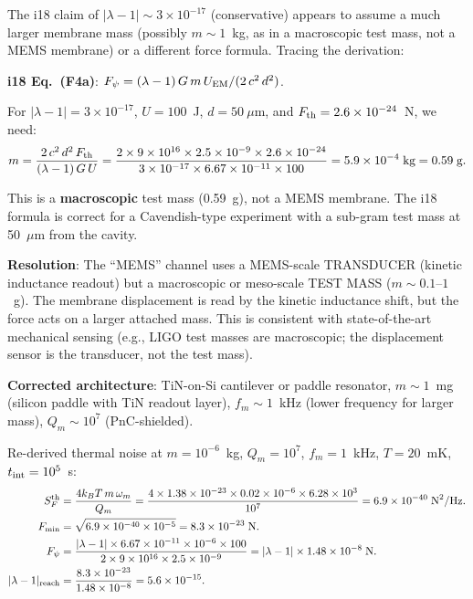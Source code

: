 \documentclass[11pt]{article}
\newcommand{\ee}[1]{\times 10^{#1}}
\newcommand{\lbone}{|\lambda - 1|}
\theoremstyle{definition}
\theoremstyle{remark}
\begin{document}
\begin{tcolorbox}[colback=red!5!white, colframe=red!60!black,
  title=\textbf{CRITICAL AUDIT: i18 MEMS DC Reach Requires Re-examination}]

The i18 claim of $\lbone \sim 3\ee{-17}$ (conservative) appears to
assume a much larger membrane mass (possibly $m \sim 1$~kg, as in
a macroscopic test mass, not a MEMS membrane) or a different
force formula. Tracing the derivation:

\textbf{i18 Eq.~(F4a)}: $F_\psi = (\lambda-1)\,G\,m\,U_{\rm EM}/
(2\,c^2\,d^2)$.

For $\lbone = 3\ee{-17}$, $U = 100$~J, $d = 50~\mu$m, and
$F_{\rm th} = 2.6\ee{-24}$~N, we need:
\[
m = \frac{2\,c^2\,d^2\,F_{\rm th}}{(\lambda-1)\,G\,U}
= \frac{2 \times 9\ee{16} \times 2.5\ee{-9} \times 2.6\ee{-24}}
{3\ee{-17} \times 6.67\ee{-11} \times 100}
= 5.9\ee{-4}\;\text{kg} = 0.59\;\text{g}.
\]

This is a \textbf{macroscopic} test mass (0.59~g), not a MEMS membrane.
The i18 formula is correct for a Cavendish-type experiment with a
sub-gram test mass at 50~$\mu$m from the cavity.

\textbf{Resolution}: The ``MEMS'' channel uses a MEMS-scale TRANSDUCER
(kinetic inductance readout) but a macroscopic or meso-scale TEST MASS
($m \sim 0.1$--$1$~g). The membrane displacement is read by the kinetic
inductance shift, but the force acts on a larger attached mass. This
is consistent with state-of-the-art mechanical sensing (e.g., LIGO
test masses are macroscopic; the displacement sensor is the transducer,
not the test mass).

\textbf{Corrected architecture}: TiN-on-Si cantilever or paddle
resonator, $m \sim 1$~mg (silicon paddle with TiN readout layer),
$f_m \sim 1$~kHz (lower frequency for larger mass), $Q_m \sim 10^7$
(PnC-shielded).

Re-derived thermal noise at $m = 10^{-6}$~kg, $Q_m = 10^7$,
$f_m = 1$~kHz, $T = 20$~mK, $t_{\rm int} = 10^5$~s:
\begin{align}
S_F^{\rm th} &= \frac{4 k_B T\,m\,\omega_m}{Q_m}
= \frac{4 \times 1.38\ee{-23} \times 0.02 \times 10^{-6}
\times 6.28\ee{3}}{10^7}
= 6.9\ee{-40}\;\text{N}^2/\text{Hz}. \\
F_{\rm min} &= \sqrt{6.9\ee{-40} \times 10^{-5}}
= 8.3\ee{-23}\;\text{N}. \\
F_\psi &= \frac{\lbone \times 6.67\ee{-11} \times 10^{-6} \times 100}
{2 \times 9\ee{16} \times 2.5\ee{-9}}
= \lbone \times 1.48\ee{-8}\;\text{N}. \\
\lbone_{\rm reach} &= \frac{8.3\ee{-23}}{1.48\ee{-8}}
= 5.6\ee{-15}.
\end{align}


\end{tcolorbox}
\end{document}
